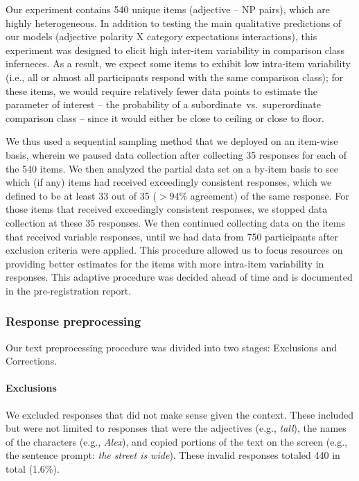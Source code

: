 \documentclass[doc]{apa6}
\begin{document}
Our experiment contains 540 unique items (adjective -- NP pairs), which are highly heterogeneous.
In addition to testing the main qualitative predictions of our models (adjective polarity X category expectations interactions), this experiment was designed to elicit high inter-item variability in comparison class inferneces.
As a result, we expect some items to exhibit low intra-item variability  (i.e., all or almost all participants respond with the same comparison class); for these items, we would require relatively fewer data points to estimate the parameter of interest -- the probability of a subordinate~vs.~superordinate comparison class -- since it would either be close to ceiling or close to floor. 

We thus used a sequential sampling method that we deployed on an item-wise basis, wherein we paused data collection after collecting 35 responses for each of the 540 items.
We then analyzed the partial data set on a by-item basis to see which (if any) items had received exceedingly consistent responses, which we defined to be at least 33 out of 35  ($>94\%$ agreement) of the same response. 
For those items that received exceedingly consistent responses, we stopped data collection at these 35 responses. 
We then continued collecting data on the items that received variable responses, until we had data from 750 participants after exclusion criteria were applied.
This procedure allowed us to focus resources on providing better estimates for the items with more intra-item variability in responses. 
This adaptive procedure was decided ahead of time and is documented in the pre-registration report. 

\subsubsection{Response preprocessing}

Our text preprocessing procedure was divided into two stages: Exclusions and Corrections. 

\paragraph{Exclusions}

We excluded responses that did not make sense given the context.
These included but were not limited to responses that were the adjectives (e.g., \emph{tall}), the names of the characters (e.g., \emph{Alex}), and copied portions of the text on the screen (e.g., the sentence prompt: \emph{the street is wide}). These invalid responses totaled 440 in total (1.6\%). 
\end{document}
